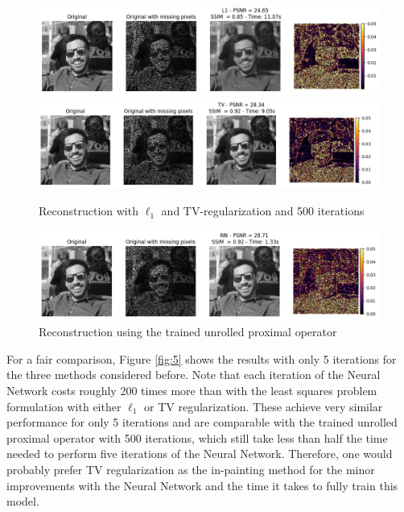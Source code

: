 \documentclass{article}
\begin{document}
\begin{enumerate}[label=2.\arabic*]
    \begin{figure}[H]
        \centering
        \includegraphics[trim={.5cm .5cm 0cm 0cm},clip,width=\textwidth]{img/reconstruction_l1.png}
        \includegraphics[trim={.5cm .5cm .5cm 0cm},clip,width=\textwidth]{img/reconstruction_tv.png}
        \caption{Reconstruction with $\ell_1$ and TV-regularization and 500 iterations}
        \label{fig:rec_500}
    \end{figure}
    \begin{figure}[H]
        \centering
        \includegraphics[trim={.5cm .5cm .5cm 0cm},clip,width=\textwidth]{img/reconstruction_nn.png}
        \caption{Reconstruction using the trained unrolled proximal operator}
        \label{fig:rec_nn}
    \end{figure}
    
    For a fair comparison, Figure \ref{fig:5} shows the results with only 5 iterations for the three methods considered before. Note that each iteration of the Neural Network costs roughly 200 times more than with the least squares problem formulation with either $\ell_1$ or TV regularization. These achieve very similar performance for only 5 iterations and are comparable with the trained unrolled proximal operator with 500 iterations, which still take less than half the time needed to perform five iterations of the Neural Network. Therefore, one would probably prefer TV regularization as the in-painting method for the minor improvements with the Neural Network and the time it takes to fully train this model.
    

\end{enumerate}
\end{document}
